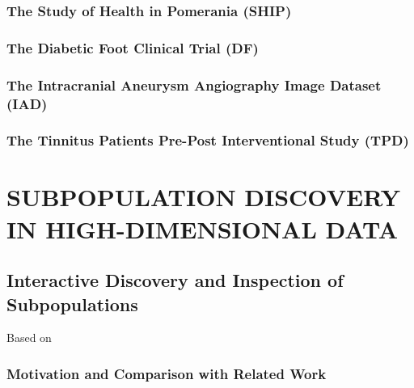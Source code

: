 \documentclass[
]{book}
\begin{document}
\hypertarget{the-study-of-health-in-pomerania-ship}{%
\section{The Study of Health in Pomerania (SHIP)}\label{the-study-of-health-in-pomerania-ship}}

\hypertarget{the-diabetic-foot-clinical-trial-df}{%
\section{The Diabetic Foot Clinical Trial (DF)}\label{the-diabetic-foot-clinical-trial-df}}

\hypertarget{the-intracranial-aneurysm-angiography-image-dataset-iad}{%
\section{The Intracranial Aneurysm Angiography Image Dataset (IAD)}\label{the-intracranial-aneurysm-angiography-image-dataset-iad}}

\hypertarget{the-tinnitus-patients-pre-post-interventional-study-tpd}{%
\section{The Tinnitus Patients Pre-Post Interventional Study (TPD)}\label{the-tinnitus-patients-pre-post-interventional-study-tpd}}

\hypertarget{part-subpopulation-discovery-in-high-dimensional-data}{%
\part{SUBPOPULATION DISCOVERY IN HIGH-DIMENSIONAL DATA}\label{part-subpopulation-discovery-in-high-dimensional-data}}

\hypertarget{imm}{%
\chapter{Interactive Discovery and Inspection of Subpopulations}\label{imm}}

Based on \autocite{Niemann:ESWA2014}

\hypertarget{motivation-and-comparison-with-related-work}{%
\section{Motivation and Comparison with Related Work}\label{motivation-and-comparison-with-related-work}}
\end{document}
